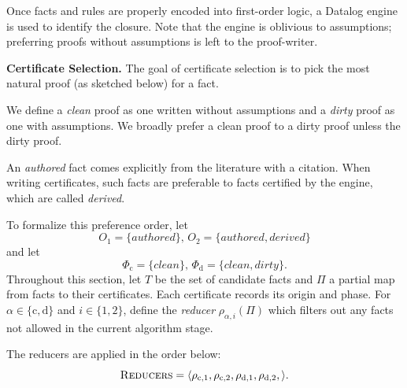 Once facts and rules are properly encoded into first-order logic, a Datalog engine is used to identify the closure. Note that the engine is oblivious to assumptions; preferring proofs without assumptions is left to the proof-writer.

\textbf{Certificate Selection.} The goal of certificate selection is to pick the most natural proof (as sketched below) for a fact.


We define a \emph{clean} proof as one written without assumptions and a \emph{dirty} proof as one with assumptions. We broadly prefer a clean proof to a dirty proof unless the dirty proof.

An \emph{authored} fact comes explicitly from the literature with a citation. When writing certificates, such facts are preferable to facts certified by the engine, which are called \emph{derived}.

To formalize this preference order, let
\[
O_1=\{\mathit{authored}\},\,
O_2=\{\mathit{authored},\mathit{derived}\}
\]
and let
\[
\Phi_{\mathrm c}=\{\mathit{clean}\},\,
\Phi_{\mathrm d}=\{\mathit{clean},\mathit{dirty}\}.
\]
Throughout this section, let \(T\) be the set of candidate facts and \(\Pi\) a partial map from facts to their certificates.  Each certificate records its origin and phase.  For \(\alpha\in\{\mathrm c,\mathrm d\}\) and
\(i\in\{1,2\}\), define the \emph{reducer} $\rho_{\alpha,i}(\Pi)$ which filters out any facts not allowed in the current algorithm stage.

The reducers are applied in the order below:
\[
\textsc{Reducers}=\langle
\rho_{\mathrm c,1},\rho_{\mathrm c,2},
\rho_{\mathrm d,1},\rho_{\mathrm d,2},
\rangle .
\]


